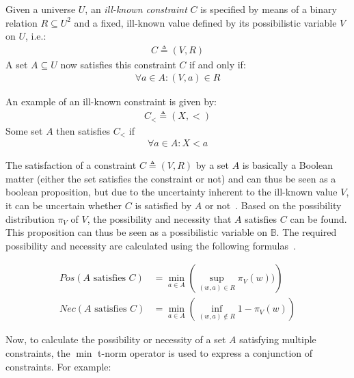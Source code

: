 \begin{svgraybox}
\vspace{-10pt}
\begin{definition}
Given a universe $U$, an \emph{ill-known constraint} $C$ is specified by means of a binary relation $R \subseteq U^{2}$ and a fixed, ill-known value defined by its possibilistic variable $V$ on $U$, i.e.:
\begin{align}
C \triangleq (V,R) \nonumber
\end{align}
A set $A \subseteq U$ now satisfies this constraint $C$ if and only if:
\begin{align}
\forall a \in A : (V,a) \in R \nonumber
\end{align}
\end{definition}
\vspace{-10pt}
\end{svgraybox}

An example of an ill-known constraint is given by:
\begin{align}
C_{<} \triangleq (X, <) \nonumber
\end{align}
Some set $A$ then satisfies $C_{<}$ if 
\begin{align}
\forall a \in A : X <a \nonumber
\end{align}

The satisfaction of a constraint $C \triangleq (V,R)$ by a set $A$ is basically a Boolean matter (either the set satisfies the constraint or not) and can thus be seen as a boolean proposition, but due to the uncertainty inherent to the ill-known value $V$, it can be uncertain whether $C$ is satisfied by $A$ or not~\cite{Pon11}. Based on the possibility distribution $\pi_{V}$ of $V$, the possibility and necessity that $A$ satisfies $C$ can be found. This proposition can thus be seen as a possibilistic variable on $\mathbb{B}$. The required possibility and necessity are calculated using the following formulas~\cite{Pon11}.

\begin{align}
Pos(A\text{ satisfies }C) & = \min_{a \in A}\left(\sup_{(w,a) \in R}\pi_{V}(w))\right) \label{eq:pos}\\
Nec(A\text{ satisfies }C) & = \min_{a \in A}\left(\inf_{(w,a) \notin R} 1-\pi_{V}(w)\right) \label{eq:nec}
\end{align}

Now, to calculate the possibility or necessity of a set $A$ satisfying multiple constraints, the $\min$ t-norm operator is used to express a conjunction of constraints. For example:

